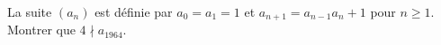 La suite $(a_n)$ est définie par $a_0 = a_1 = 1$ et $a_{n+1} = a_{n-1}a_n + 1$ pour $n \geq 1$. Montrer que $4 \nmid a_{1964}$.
